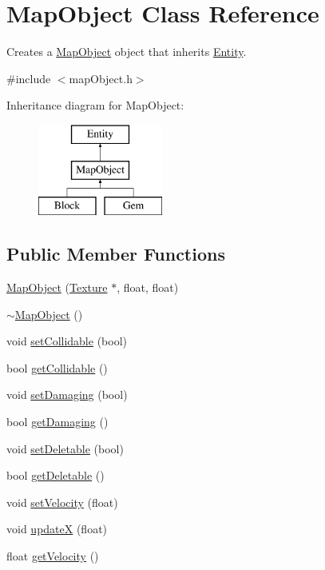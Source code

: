 \hypertarget{class_map_object}{\section{Map\+Object Class Reference}
\label{class_map_object}
}


Creates a \hyperlink{class_map_object}{Map\+Object} object that inherits \hyperlink{class_entity}{Entity}.  




{\ttfamily \#include $<$map\+Object.\+h$>$}

Inheritance diagram for Map\+Object\+:\begin{figure}[H]
\begin{center}
\leavevmode
\includegraphics[height=3.000000cm]{class_map_object}
\end{center}
\end{figure}
\subsection*{Public Member Functions}
\begin{DoxyCompactItemize}
\item 
\hyperlink{class_map_object_a1bd76f155f6f90b7d74a06f720bd3b3d}{Map\+Object} (\hyperlink{class_texture}{Texture} $\ast$, float, float)
\item 
\hyperlink{class_map_object_aa601344267a49df197e841fcbd732209}{$\sim$\+Map\+Object} ()
\item 
void \hyperlink{class_map_object_afc35a1271fdb83198e239a548b26337e}{set\+Collidable} (bool)
\item 
bool \hyperlink{class_map_object_a5c940048e408308c71b57a78444d155d}{get\+Collidable} ()
\item 
void \hyperlink{class_map_object_abcf8499f40944338e194abcbd3294852}{set\+Damaging} (bool)
\item 
bool \hyperlink{class_map_object_acaa0fff07bd2550c1f023ca90e2a4b04}{get\+Damaging} ()
\item 
void \hyperlink{class_map_object_af14721fd27162d9fd0f04f69d8087811}{set\+Deletable} (bool)
\item 
bool \hyperlink{class_map_object_a739bba3a3a50a84bf5e6244d19152a38}{get\+Deletable} ()
\item 
void \hyperlink{class_map_object_a45334339657baae05374453254441351}{set\+Velocity} (float)
\item 
void \hyperlink{class_map_object_aea8289c05e1c4cd99fabc8cb756535e4}{update\+X} (float)
\item 
float \hyperlink{class_map_object_a5a9530b3b098db1e9fe636d0ab92c4ff}{get\+Velocity} ()
\end{DoxyCompactItemize}
